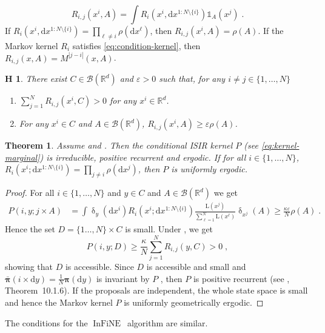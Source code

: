 \documentclass{article}
\newtheorem{theorem}{Theorem}
\newtheorem{assumption}{\textbf{H}\hspace{-3pt}}
\def\IFIS{\ensuremath{\operatorname{InFiNE}}}
\def\rmd{\operatorname{d}\hspace{-2pt}}
\def\rset{\mathbb{R}}
\def\rmd{\mathrm{d}}
\def\eqsp{\,}
\def\borel{\mathcal{B}}
\def\eqsp{\;}
\newcommand{\1}{\mathds{1}}
\newcommand{\indi}[1]{\1_{#1}}
\def\proposal{\rho}
\newcommand{\chunkum}[4]{#1^{#2:#3 \setminus \{#4\}}}
\def\measpi{\boldsymbol{\pi}}
\def\rset{\mathbb{R}}
\def\rmd{\mathrm{d}}
\def\likelihood{\mathrm{L}}
\def\likeratio{\kappa}
\def\minor{\varepsilon}
\begin{document}
\begin{equation}
\label{eq:definition-R-i-j}
R_{i,j}(x^i,A)= \int R_i(x^i,\rmd \chunkum{x}{1}{N}{i}) \indi{A}(x^j) \eqsp.
\end{equation}
If $R_i(x^i,\rmd \chunkum{x}{1}{N}{i})= \prod_{\ell \neq i} \proposal(\rmd x^\ell)$, then $R_{i,j}(x^i,A)= \proposal(A)$. If the Markov kernel $R_i$ satisfies \eqref{eq:condition-kernel}, then $R_{i,j}(x,A)= M^{|j-i|}(x,A)$.
\begin{assumption}
\label{assum:marginal-kernels}
There exist $C \in \borel(\rset^d)$  and $\minor > 0$ such that, for any $i \neq j \in \{1,\dots, N\}$
\begin{enumerate}
\item $\sum_{j=1}^N R_{i,j}(x^i, C) > 0$ for any $x^i \in \rset^d$.
\item For any  $x^i \in C$ and $A \in \borel(\rset^d)$,  $R_{i,j}(x^i,A) \geq \minor \proposal(A)$.
\end{enumerate}
\end{assumption}
\begin{theorem}
\label{theo:uniform-ergodicity-ISIR}
Assume  and . Then the conditional ISIR kernel $P$ (see \eqref{eq:kernel-marginal}) is irreducible, positive recurrent and ergodic. If for all $i \in \{1,\dots,N\}$, $R_i(x^i; \rmd \chunkum{x}{1}{N}{i})= \prod_{j \neq i} \proposal(\rmd x^j)$, then $P$ is uniformly ergodic.
\end{theorem}
\begin{proof}
For all $i \in \{1,\dots,N\}$ and $y \in C$ and $A \in \borel(\rset^d)$ we get
\begin{align*}
P(i,y; j \times A)
&= \int \updelta_{y}(\rmd x^i) R_i(x^i; \rmd \chunkum{x}{1}{N}{i}) \frac{\likelihood(x^j)}{\sum_{\ell=1}^N \likelihood(x^\ell)} \updelta_{x^j}(A) \geq \frac{\likeratio \minor}{N} \proposal(A) \eqsp.
\end{align*}
Hence the set $D= \{1\dots,N\} \times C$ is small. Under , we get
\[
P(i,y; D) \geq \frac{\kappa}{N} \sum_{j=1}^N R_{i,j}(y,C) > 0 \eqsp,
\]
showing that $D$ is accessible. Since $D$ is accessible and small and $\bar{\measpi}(i \times \rmd y)= \frac{1}{N} \measpi(\rmd y)$ is invariant by $P$ , then $P$ is positive recurrent (see \cite{douc:moulines:priouret:2018}, Theorem~10.1.6). If the proposals are independent, the whole state space is small and hence the Markov kernel $P$ is uniformly geometrically ergodic.
\end{proof}
The conditions for the \IFIS\ algorithm are similar.
\end{document}
